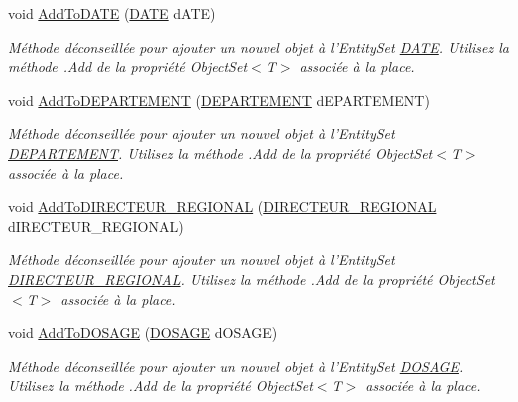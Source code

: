 \begin{DoxyCompactItemize}
void \hyperlink{class_model_1_1_b_d_d___s_i_o7_entities_aeeb273ac215656570d8b100487cc4062}{Add\-To\-D\-A\-T\-E} (\hyperlink{class_model_1_1_d_a_t_e}{D\-A\-T\-E} d\-A\-T\-E)
\begin{DoxyCompactList}\small\item\em Méthode déconseillée pour ajouter un nouvel objet à l'Entity\-Set \hyperlink{class_model_1_1_d_a_t_e}{D\-A\-T\-E}. Utilisez la méthode .Add de la propriété Object\-Set$<$T$>$ associée à la place. \end{DoxyCompactList}\item 
void \hyperlink{class_model_1_1_b_d_d___s_i_o7_entities_abaee891d220207d23a9ee04a1764b781}{Add\-To\-D\-E\-P\-A\-R\-T\-E\-M\-E\-N\-T} (\hyperlink{class_model_1_1_d_e_p_a_r_t_e_m_e_n_t}{D\-E\-P\-A\-R\-T\-E\-M\-E\-N\-T} d\-E\-P\-A\-R\-T\-E\-M\-E\-N\-T)
\begin{DoxyCompactList}\small\item\em Méthode déconseillée pour ajouter un nouvel objet à l'Entity\-Set \hyperlink{class_model_1_1_d_e_p_a_r_t_e_m_e_n_t}{D\-E\-P\-A\-R\-T\-E\-M\-E\-N\-T}. Utilisez la méthode .Add de la propriété Object\-Set$<$T$>$ associée à la place. \end{DoxyCompactList}\item 
void \hyperlink{class_model_1_1_b_d_d___s_i_o7_entities_a9ee07c8d5764c160ea9ddcf97936a69f}{Add\-To\-D\-I\-R\-E\-C\-T\-E\-U\-R\-\_\-\-R\-E\-G\-I\-O\-N\-A\-L} (\hyperlink{class_model_1_1_d_i_r_e_c_t_e_u_r___r_e_g_i_o_n_a_l}{D\-I\-R\-E\-C\-T\-E\-U\-R\-\_\-\-R\-E\-G\-I\-O\-N\-A\-L} d\-I\-R\-E\-C\-T\-E\-U\-R\-\_\-\-R\-E\-G\-I\-O\-N\-A\-L)
\begin{DoxyCompactList}\small\item\em Méthode déconseillée pour ajouter un nouvel objet à l'Entity\-Set \hyperlink{class_model_1_1_d_i_r_e_c_t_e_u_r___r_e_g_i_o_n_a_l}{D\-I\-R\-E\-C\-T\-E\-U\-R\-\_\-\-R\-E\-G\-I\-O\-N\-A\-L}. Utilisez la méthode .Add de la propriété Object\-Set$<$T$>$ associée à la place. \end{DoxyCompactList}\item 
void \hyperlink{class_model_1_1_b_d_d___s_i_o7_entities_a2a4456e3b6fe7f7ec716a9e8151513df}{Add\-To\-D\-O\-S\-A\-G\-E} (\hyperlink{class_model_1_1_d_o_s_a_g_e}{D\-O\-S\-A\-G\-E} d\-O\-S\-A\-G\-E)
\begin{DoxyCompactList}\small\item\em Méthode déconseillée pour ajouter un nouvel objet à l'Entity\-Set \hyperlink{class_model_1_1_d_o_s_a_g_e}{D\-O\-S\-A\-G\-E}. Utilisez la méthode .Add de la propriété Object\-Set$<$T$>$ associée à la place. \end{DoxyCompactList}\item 

\end{DoxyCompactItemize}

